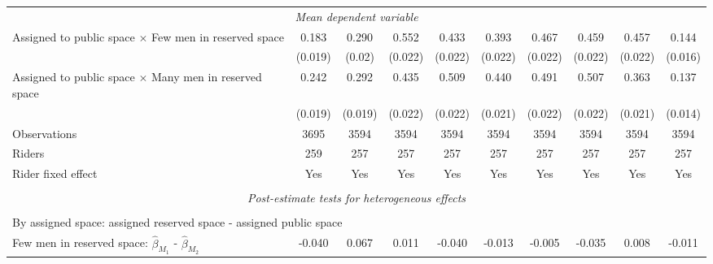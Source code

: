 \begin{tabular}{l*{9}{c}}
\multicolumn{10}{c}{\textit{Mean dependent variable}} \\ Assigned to public space $\times$ Few men in reserved space&       0.183         &       0.290         &       0.552         &       0.433         &       0.393         &       0.467         &       0.459         &       0.457         &       0.144         \\
\,                  &     (0.019)         &      (0.02)         &     (0.022)         &     (0.022)         &     (0.022)         &     (0.022)         &     (0.022)         &     (0.022)         &     (0.016)         \\
Assigned to public space $\times$ Many men in reserved space&       0.242         &       0.292         &       0.435         &       0.509         &       0.440         &       0.491         &       0.507         &       0.363         &       0.137         \\
\,                  &     (0.019)         &     (0.019)         &     (0.022)         &     (0.022)         &     (0.021)         &     (0.022)         &     (0.022)         &     (0.021)         &     (0.014)         \\
Observations        &        3695         &        3594         &        3594         &        3594         &        3594         &        3594         &        3594         &        3594         &        3594         \\
Riders              &         259         &         257         &         257         &         257         &         257         &         257         &         257         &         257         &         257         \\
Rider fixed effect  &         Yes         &         Yes         &         Yes         &         Yes         &         Yes         &         Yes         &         Yes         &         Yes         &         Yes         \\
\hline \\[-1ex]  \multicolumn{10}{c}{\textit{Post-estimate tests for heterogeneous effects}} \\\\[-1ex] \multicolumn{10}{l}{By assigned space: assigned reserved space - assigned public space} \\ \quad Few men in reserved space: $\hat\beta_{M_1}$ - $\hat\beta_{M_2}$&      -0.040         &       0.067         &       0.011         &      -0.040         &      -0.013         &      -0.005         &      -0.035         &       0.008         &      -0.011         \\

\end{tabular}
